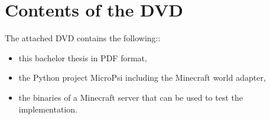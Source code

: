\documentclass{thesisPST}
\begin{document}

\chapter{Contents of the DVD}
The attached DVD contains the following::
\begin{itemize}
	\item this bachelor thesis in PDF format,
	\item the Python project MicroPsi including the Minecraft world adapter,
	\item the binaries of a Minecraft server that can be used to test the implementation.
\end{itemize}

\cleardoublepage
{}
{} %

\end{document}
